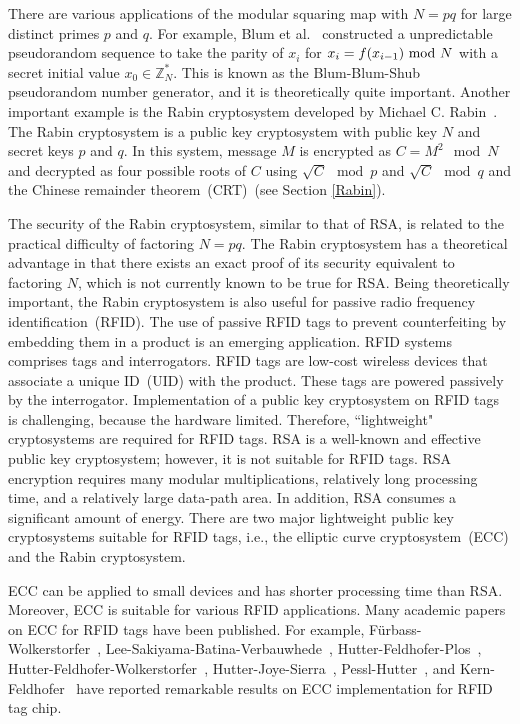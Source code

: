 \documentclass{article}
\newcommand{\Mod}{\text{\rm mod }}
\begin{document}
There are various applications of the modular squaring map with $N=pq$ for large distinct primes $p$ and $q$.
For example, Blum et al.~\cite{BBS} constructed a unpredictable pseudorandom sequence to take the parity of $x_i$ for 
$x_i = f(x_{i-1})~\Mod N$ with a secret initial value $x_0\in\mathbb{Z}_N^*$. 
This is known as the Blum-Blum-Shub pseudorandom number generator, and it is theoretically quite important. 
Another important example is the Rabin cryptosystem developed by Michael C. Rabin~\cite{Rabin}.
The Rabin cryptosystem is a public key cryptosystem with public key $N$ and secret keys $p$ and $q$. 
In this system, message $M$ is encrypted as $C = M^2~\bmod N$ and decrypted as 
four possible roots of $C$ using $\sqrt{C}~\bmod p$ and $\sqrt{C}~\bmod q$ and the 
Chinese remainder theorem~(CRT)~(see Section \ref{Rabin}). 

The security of the Rabin cryptosystem, similar to that of RSA, 
is related to the practical difficulty of factoring $N=pq$.
The Rabin cryptosystem has a theoretical advantage in that there exists an exact proof of 
its security equivalent to factoring $N$, which is not currently known to be true for RSA.  
Being theoretically important, the Rabin cryptosystem is also useful 
for passive radio frequency identification~(RFID). 
The use of passive RFID tags to prevent counterfeiting by embedding them in a product is an emerging application. 
RFID systems comprises tags and interrogators.
RFID tags are low-cost wireless devices that associate a unique ID~(UID) with the product.
These tags are powered passively by the interrogator.
Implementation of a public key cryptosystem on RFID tags is challenging, 
because the hardware limited.  Therefore, ``lightweight" cryptosystems are required for RFID tags.
RSA is a well-known and effective public key cryptosystem; however, 
it is not suitable for RFID tags.
RSA encryption requires many modular multiplications, relatively long processing time, 
and a relatively large data-path area. 
In addition, RSA consumes a significant amount of energy. 
There are two major lightweight public key cryptosystems suitable for RFID tags, i.e., 
the elliptic curve cryptosystem~(ECC) and the Rabin cryptosystem. 

ECC can be applied to small devices and has shorter processing time than RSA. 
Moreover, ECC is suitable for various RFID applications. 
Many academic papers on ECC for RFID tags have been published.
For example, F\"urbass-Wolkerstorfer~\cite{Furbass}, Lee-Sakiyama-Batina-Verbauwhede~\cite{Lee}, 
Hutter-Feldhofer-Plos~\cite{Hutter1}, Hutter-Feldhofer-Wolkerstorfer~\cite{Hutter2}, 
Hutter-Joye-Sierra~\cite{Hutter3}, Pessl-Hutter~\cite{Hutter4}, and Kern-Feldhofer~\cite{Kern} 
have reported remarkable results on ECC implementation for RFID tag chip. 
\end{document}
